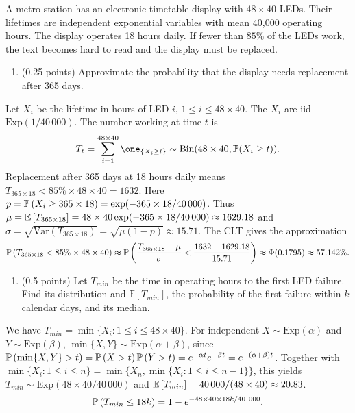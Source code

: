 \documentclass[a4paper]{report}
\begin{document}
\begin{problem}
A metro station has an electronic timetable display with $48\times40$ LEDs. Their lifetimes are independent exponential variables with mean 40,000 operating hours. The display operates 18 hours daily. If fewer than $85\%$ of the LEDs work, the text becomes hard to read and the display must be replaced.
\begin{enumerate}
    \item (0.25 points) Approximate the probability that the display needs replacement after 365 days.
\end{enumerate}
Let $X_i$ be the lifetime in hours of LED $i$, $1\leq i\leq48\times40$. The $X_i$ are iid $\mbox{Exp}(1/40\,000)$. The number working at time $t$ is $$T_t=\sum_{i=1}^{48\times40}\one_{\{X_i\geq t\}}\sim\mbox{Bin}(48\times40,\P(X_i\geq t)).$$
Replacement after 365 days at 18 hours daily means $T_{365\times18}<85\%\times48\times40=1632$. Here $p=\mathbb P\left( X_i\geq365\times18\right)=\exp(-365\times18/40\,000)$. Thus $\mu=\mathbb {E}\left[ T_{365\times18}\right]=48\times40\exp(-365\times18/40\,000)\approx1629.18$ and $\sigma=\sqrt{\mbox{Var}(T_{365\times18})}=\sqrt{\mu(1-p)}\approx15.71$. The CLT gives the approximation
$$\mathbb P\left( T_{365\times18}<85\%\times48\times40\right) \approx \mathbb P\left( \frac{T_{365\times18}-\mu}{\sigma}<\frac{1632-1629.18}{15.71}\right)\approx \Phi(0.1795)\approx 57.142\%.$$

\begin{enumerate}[resume]
    \item (0.5 points) Let $T_{min}$ be the time in operating hours to the first LED failure. Find its distribution and $\mathbb E[T_{min}]$, the probability of the first failure within $k$ calendar days, and its median.
\end{enumerate}
We have $T_{min}=\min\{X_i:1\leq i\leq48\times40\}$. For independent $X\sim\mbox{Exp}(\alpha)$ and $Y\sim\mbox{Exp}(\beta)$, $\min\{X,Y\}\sim\mbox{Exp}(\alpha+\beta)$, since $\mathbb P\left( \min\{X,Y\}>t\right)=\mathbb P\left( X>t\right)\mathbb P\left( Y>t\right)=e^{-\alpha t}e^{-\beta t}=e^{-(\alpha+\beta)t}$. Together with $\min\{X_i:1\leq i\leq n\}=\min\{X_n,\min\{X_i:1\leq i\leq n-1\}\}$, this yields $T_{min}\sim\mbox{Exp}(48\times40/40\,000)$ and $\mathbb {E}\left[ T_{min}\right]=40\,000/(48\times40)\approx20.83$.
$$\mathbb P\left( T_{min} \leq 18k\right) = 1-e^{-48\times40\times18k/40~000}.$$


\end{problem}
\end{document}
